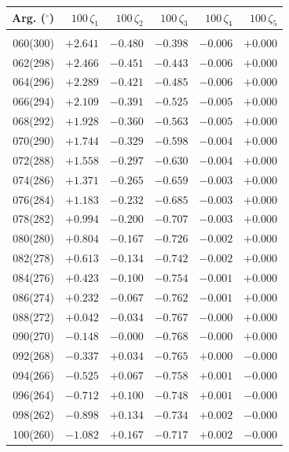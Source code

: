 \clearpage
\begin{table}[!h]\centering
\vspace{0.25cm}
\begin{tabular}{rrrrrr}
Arg. ($^\circ$) & $100\,\zeta_1$  & $100\,\zeta_2$ & $100\,\zeta_3$ & $100\,\zeta_4$  & $100\,\zeta_5$  \\\hline
&&&&&\\[-1.75ex]
060(300) & $+2.641$ & $-0.480$ & $-0.398$ & $-0.006$ & $+0.000$ \\ 
062(298) & $+2.466$ & $-0.451$ & $-0.443$ & $-0.006$ & $+0.000$ \\ 
064(296) & $+2.289$ & $-0.421$ & $-0.485$ & $-0.006$ & $+0.000$ \\ 
066(294) & $+2.109$ & $-0.391$ & $-0.525$ & $-0.005$ & $+0.000$ \\ 
068(292) & $+1.928$ & $-0.360$ & $-0.563$ & $-0.005$ & $+0.000$ \\ 
070(290) & $+1.744$ & $-0.329$ & $-0.598$ & $-0.004$ & $+0.000$ \\
072(288) & $+1.558$ & $-0.297$ & $-0.630$ & $-0.004$ & $+0.000$ \\ 
074(286) & $+1.371$ & $-0.265$ & $-0.659$ & $-0.003$ & $+0.000$ \\ 
076(284) & $+1.183$ & $-0.232$ & $-0.685$ & $-0.003$ & $+0.000$ \\ 
078(282) & $+0.994$ & $-0.200$ & $-0.707$ & $-0.003$ & $+0.000$ \\ 
080(280) & $+0.804$ & $-0.167$ & $-0.726$ & $-0.002$ & $+0.000$ \\ 
082(278) & $+0.613$ & $-0.134$ & $-0.742$ & $-0.002$ & $+0.000$ \\ 
084(276) & $+0.423$ & $-0.100$ & $-0.754$ & $-0.001$ & $+0.000$ \\ 
086(274) & $+0.232$ & $-0.067$ & $-0.762$ & $-0.001$ & $+0.000$ \\ 
088(272) & $+0.042$ & $-0.034$ & $-0.767$ & $-0.000$ & $+0.000$ \\
090(270) & $-0.148$ & $-0.000$ & $-0.768$ & $-0.000$ & $+0.000$ \\
092(268) & $-0.337$ & $+0.034$ & $-0.765$ & $+0.000$ & $-0.000$\\
094(266) & $-0.525$ & $+0.067$ & $-0.758$ & $+0.001$ & $-0.000$\\
096(264) & $-0.712$ & $+0.100$ & $-0.748$ & $+0.001$ & $-0.000$\\
 098(262) & $-0.898$ & $+0.134$ & $-0.734$ & $+0.002$ & $-0.000$\\
 100(260) & $-1.082$ & $+0.167$ & $-0.717$ & $+0.002$ & $-0.000$\\

\end{tabular}
\end{table}
